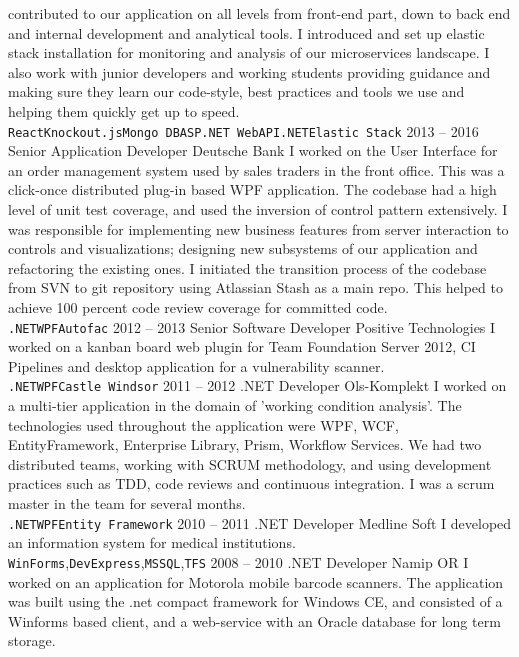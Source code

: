\documentclass[9pt]{developercv} %
\begin{document}
\begin{entrylist}
{		contributed to our application on all levels from front-end part, down to back end and internal development and analytical tools. I introduced and 
		set up elastic stack installation for monitoring and analysis of our microservices landscape. I also work with junior developers and working students 
		providing guidance and making sure they learn our code-style, best practices and tools we use and helping them quickly get up to speed.
		\\ \texttt{React}\slashsep\texttt{Knockout.js}\slashsep\texttt{Mongo DB}\slashsep\texttt{ASP.NET WebAPI}\texttt{.NET}\slashsep\texttt{Elastic Stack}}
	\entry
		{2013 -- 2016}
		{Senior Application Developer}
		{Deutsche Bank}
		{I worked on the User Interface for an order management system used by sales traders in the front office. This was a click-once 
		distributed plug-in based WPF application. The codebase had a high level of unit test coverage, and used the inversion of control 
		pattern extensively. I was responsible for implementing new business features from server interaction to controls and 
		visualizations; designing new subsystems of our application and refactoring the existing ones. I initiated the transition 
		process of the codebase from SVN to git repository using Atlassian Stash as a main repo. This helped to achieve 100 percent 
		code review coverage for committed code.
		\\ \texttt{.NET}\slashsep\texttt{WPF}\slashsep\texttt{Autofac}}
	\entry
		{2012 -- 2013}
		{Senior Software Developer}
		{Positive Technologies}
		{I worked on a kanban board web plugin for Team Foundation Server 2012, CI Pipelines and desktop application for a vulnerability scanner.
		\\ \texttt{.NET}\slashsep\texttt{WPF}\slashsep\texttt{Castle Windsor}}
	\entry
		{2011 -- 2012}
		{.NET Developer}
		{Ols-Komplekt}
		{I worked on a multi-tier application in the domain of 'working condition analysis'. The technologies used throughout the application were WPF, WCF, EntityFramework, Enterprise Library, Prism, Workflow Services. We had two distributed teams, working with SCRUM methodology, and using development practices such as TDD, code reviews and continuous integration. I was a scrum master in the team for several months.
		\\ \texttt{.NET}\slashsep\texttt{WPF}\slashsep\texttt{Entity Framework}}
	\entry
		{2010 -- 2011}
		{.NET Developer}
		{Medline Soft}
		{I developed an information system for medical institutions.
		\\ \texttt{WinForms},\slashsep\texttt{DevExpress},\slashsep\texttt{MSSQL},\slashsep\texttt{TFS}}
	\entry
		{2008 -- 2010}
		{.NET Developer}
		{Namip OR}
		{I worked on an application for Motorola mobile barcode scanners. The application was built using the .net compact framework for Windows CE, and consisted of a Winforms based client, and a web-service with an Oracle database for long term storage.}
\end{entrylist}
\end{document}
